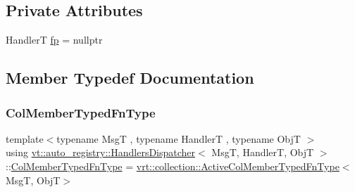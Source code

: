 \subsection*{Private Attributes}
\begin{DoxyCompactItemize}
\item 
HandlerT \hyperlink{structvt_1_1auto__registry_1_1_handlers_dispatcher_a2fe52dbcfedb744c43a0579de7c7167f}{fp} = nullptr
\end{DoxyCompactItemize}


\subsection{Member Typedef Documentation}
\mbox{\label{structvt_1_1auto__registry_1_1_handlers_dispatcher_a6f1a72ba3eec14527af044a478416b4d}} 
\subsubsection{\texorpdfstring{Col\+Member\+Typed\+Fn\+Type}{ColMemberTypedFnType}}
{\footnotesize\ttfamily template$<$typename MsgT , typename HandlerT , typename ObjT $>$ \\
using \hyperlink{structvt_1_1auto__registry_1_1_handlers_dispatcher}{vt\+::auto\+\_\+registry\+::\+Handlers\+Dispatcher}$<$ MsgT, HandlerT, ObjT $>$\+::\hyperlink{structvt_1_1auto__registry_1_1_handlers_dispatcher_a6f1a72ba3eec14527af044a478416b4d}{Col\+Member\+Typed\+Fn\+Type} =  \hyperlink{namespacevt_1_1vrt_1_1collection_a87925616c03cf4ccc548d33b2fe172ee}{vrt\+::collection\+::\+Active\+Col\+Member\+Typed\+Fn\+Type}$<$MsgT, ObjT$>$}

\mbox{\label{structvt_1_1auto__registry_1_1_handlers_dispatcher_ad45c828eebdd2a18ffc0aa64f542a85c}} 
